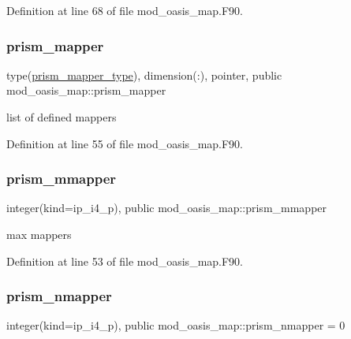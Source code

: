 Definition at line 68 of file mod\+\_\+oasis\+\_\+map.\+F90.

\mbox{\label{namespacemod__oasis__map_a00ad53f61b6998938fca792455487f7e}} 
\subsubsection{\texorpdfstring{prism\+\_\+mapper}{prism\_mapper}}
{\footnotesize\ttfamily type(\hyperlink{structmod__oasis__map_1_1prism__mapper__type}{prism\+\_\+mapper\+\_\+type}), dimension(\+:), pointer, public mod\+\_\+oasis\+\_\+map\+::prism\+\_\+mapper}



list of defined mappers 



Definition at line 55 of file mod\+\_\+oasis\+\_\+map.\+F90.

\mbox{\label{namespacemod__oasis__map_ab15f72e9f33a67181edc977c06b951e2}} 
\subsubsection{\texorpdfstring{prism\+\_\+mmapper}{prism\_mmapper}}
{\footnotesize\ttfamily integer(kind=ip\+\_\+i4\+\_\+p), public mod\+\_\+oasis\+\_\+map\+::prism\+\_\+mmapper}



max mappers 



Definition at line 53 of file mod\+\_\+oasis\+\_\+map.\+F90.

\mbox{\label{namespacemod__oasis__map_af543b83ec5bed63a4448ff641137b0c5}} 
\subsubsection{\texorpdfstring{prism\+\_\+nmapper}{prism\_nmapper}}
{\footnotesize\ttfamily integer(kind=ip\+\_\+i4\+\_\+p), public mod\+\_\+oasis\+\_\+map\+::prism\+\_\+nmapper = 0}



